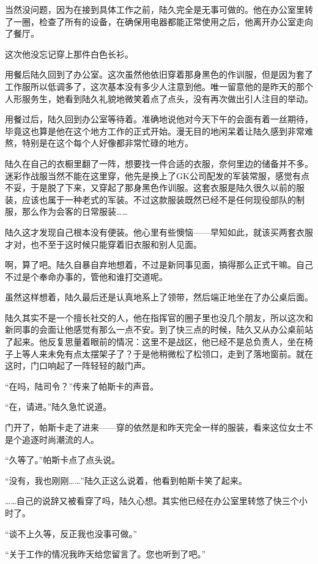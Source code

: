 当然没问题，因为在接到具体工作之前，陆久完全是无事可做的。他在办公室里转了一圈，检查了所有的设备，在确保用电器都能正常使用之后，他离开办公室走向了餐厅。

这次他没忘记穿上那件白色长衫。

用餐后陆久回到了办公室。这次虽然他依旧穿着那身黑色的作训服，但是因为套了工作服所以低调多了，这次基本没有多少人注意到他。唯一留意他的是昨天的那个人形服务生，她看到陆久礼貌地微笑着点了点头，没有再次做出引人注目的举动。

用餐过后，陆久回到办公室等待着。准确地说他对今天下午的会面有着一丝期待，毕竟这也算是他在这个地方工作的正式开始。漫无目的地闲呆着让陆久感到非常难熬，特别是在这个每个人好像都非常忙碌的地方。

陆久在自己的衣橱里翻了一阵，想要找一件合适的衣服，奈何里边的储备并不多。迷彩作战服当然不能在这里穿，他先是换上了GK公司配发的军装常服，感觉有点不妥，于是脱了下来，又穿起了那身黑色作训服。这套衣服是陆久很久以前的服装，应该也属于一种老式的军装。不过这款服装既然已经不是任何现役部队的制服，那么作为会客的日常服装……

陆久这才发现自己根本没有便装。他心里有些懊恼——早知如此，就该买两套衣服才对，也不至于这时候只能穿着旧衣服和别人见面。

啊，算了吧。陆久自暴自弃地想着，不过是新同事见面，搞得那么正式干嘛。自己不过是个奉命办事的，管他和谁打交道呢。

虽然这样想着，陆久最后还是认真地系上了领带，然后端正地坐在了办公桌后面。

陆久其实不是一个擅长社交的人，他在指挥官的圈子里也没几个朋友，所以这次和新同事的会面让他感觉有那么一点不安。到了快三点的时候，陆久又从办公桌前站了起来。他反复思量着眼前的情况：这里不是战区，他已经不是总负责人，坐在椅子上等人来未免有点太摆架子了？于是他稍微松了松领口，走到了落地窗前。就在这时，门口响起了一阵轻轻的敲门声。

“在吗，陆司令？”传来了帕斯卡的声音。

“在，请进。”陆久急忙说道。

门开了，帕斯卡走了进来——穿的依然是和昨天完全一样的服装，看来这位女士不是个追逐时尚潮流的人。

“久等了。”帕斯卡点了点头说。

“没有，我也刚刚……”陆久正这么说着，他看到帕斯卡笑了起来。

……自己的说辞又被看穿了吗，陆久心想。其实他已经在办公室里转悠了快三个小时了。

“谈不上久等，反正我也没事可做。”

“关于工作的情况我昨天给您留言了。您也听到了吧。”

